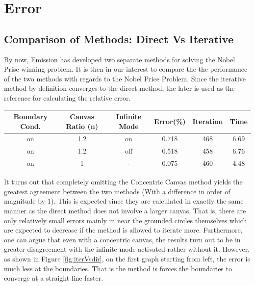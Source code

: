 \documentclass[a4paper]{article}
\begin{document}
\section{Error}
\subsection{Comparison of Methods: Direct Vs Iterative}
By now, Emission has developed two separate methods for solving the Nobel Prise winning problem. It is then in our interest to compare the the performance of the two methods with regards to the Nobel Price Problem. Since the iterative method by definition converges to the direct method, the later is used as the reference for calculating the relative error. 

\begin{table}[h]
\centering
\begin{tabular}{c c c c c c}
Boundary Cond. & Canvas Ratio (n) & Infinite Mode & Error(\%) & Iteration &  Time\\
\hline
on & 1.2 & on & 0.718 & 468 & 6.69 \\
on & 1.2 & off & 0.518 & 458 & 6.76 \\
on & 1 & - &  0.075 & 460 & 4.48\\
\end{tabular}
\end{table}
It turns out that completely omitting the Concentric Canvas method yields the greatest agreement between the two methods (With a difference in order of magnitude by 1). This is expected since they are calculated in exactly the same manner as the direct method does not involve a larger canvas. That is, there are only relatively small errors mainly in near the grounded circles themselves which are expected to decrease if the method is allowed to iterate more. Furthermore, one can argue that even with a concentric canvas, the results turn out to be in greater disagreement with the infinite mode activated rather without it. However, as shown in Figure \ref{fig:iterVsdir}, on the first graph starting from left, the error is much less at the boundaries. That is the method is forces the boundaries to converge at a straight line faster.  
\end{document}
